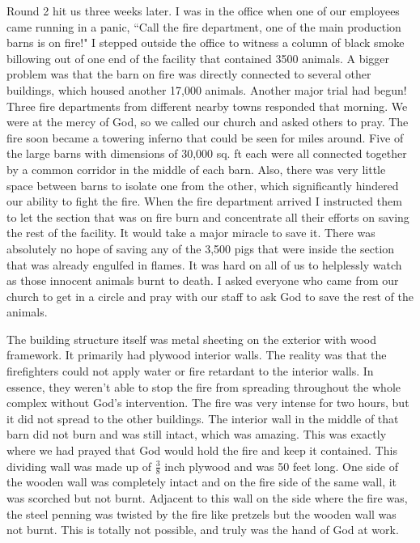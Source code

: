 \documentclass[oneside,12pt]{book}
\begin{document}
Round 2 hit us three weeks later. I was in the office when one of our employees came running in a panic, ``Call the fire department, one of the main production barns is on fire!" I stepped outside the office to witness a column of black smoke billowing out of one end of the facility that contained 3500 animals. A bigger problem was that the barn on fire was directly connected to several other buildings, which housed another 17,000 animals. Another major trial had begun! Three fire departments from different nearby towns responded that morning. We were at the mercy of God, so we called our church and asked others to pray. The fire soon became a towering inferno that could be seen for miles around. Five of the large barns with dimensions of 30,000 sq. ft each were all connected together by a common corridor in the middle of each barn. Also, there was very little space between barns to isolate one from the other, which significantly hindered our ability to fight the fire. When the fire department arrived I instructed them to let the section that was on fire burn and concentrate all their efforts on saving the rest of the facility. It would take a major miracle to save it. There was absolutely no hope of saving any of the 3,500 pigs that were inside the section that was already engulfed in flames. It was hard on all of us to helplessly watch as those innocent animals burnt to death. I asked everyone who came from our church to get in a circle and pray with our staff to ask God to save the rest of the animals.

The building structure itself was metal sheeting on the exterior with wood framework. It primarily had plywood interior walls. The reality was that the firefighters could not apply water or fire retardant to the interior walls. In essence, they weren't able to stop the fire from spreading throughout the whole complex without God's intervention. The fire was very intense for two hours, but it did not spread to the other buildings. The interior wall in the middle of that barn did not burn and was still intact, which was amazing. This was exactly where we had prayed that God would hold the fire and keep it contained. This dividing wall was made up of $\frac{3}{8}$ inch plywood and was 50 feet long. One side of the wooden wall was completely intact and on the fire side of the same wall, it was scorched but not burnt. Adjacent to this wall on the side where the fire was, the steel penning was twisted by the fire like pretzels but the wooden wall was not burnt. This is totally not possible, and truly was the hand of God at work.
\end{document}
